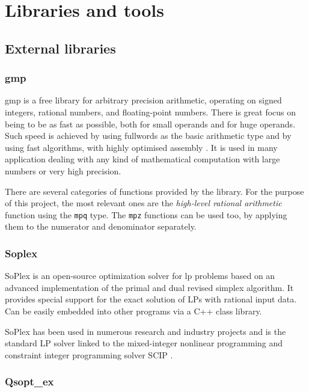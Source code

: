 \chapter{Libraries and tools}

\section{External libraries}

\subsection{gmp}

gmp is a free library for arbitrary precision arithmetic, operating on signed integers, rational numbers, and floating-point numbers.
There is great focus on being to be as fast as possible, both for small operands and for huge operands.
Such speed is achieved by using fullwords as the basic arithmetic type and by using fast algorithms, with highly optimised assembly \cite{man:gmp}.
It is used in many application dealing with any kind of mathematical computation with large numbers or very high precision.

There are several categories of functions provided by the library.
For the purpose of this project, the most relevant ones are the \textit{high-level rational arithmetic} function using the \texttt{mpq} type.
The \texttt{mpz} functions can be used too, by applying them to the numerator and denominator separately.

\subsection{Soplex}

SoPlex is an open-source optimization solver for \gls{lp} problems based on an advanced implementation of the primal and dual revised simplex algorithm.
It provides special support for the exact solution of LPs with rational input data.
Can be easily embedded into other programs via a C++ class library.

SoPlex has been used in numerous research and industry projects and is the standard LP solver linked to the mixed-integer nonlinear programming and constraint integer programming solver SCIP \cite{man:soplex}.

\subsection{Qsopt\_ex}

